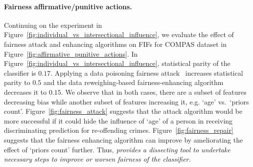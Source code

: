 \paragraph{Fairness affirmative/punitive actions.} Continuing on the experiment in Figure~\ref{fig:individual_vs_intersectional_influence}, we evaluate the effect of fairness attack and enhancing algorithms on FIFs for COMPAS dataset in Figure~\ref{fig:affirmative_punitive_actions}.  In Figure~\ref{fig:individual_vs_intersectional_influence}, statistical parity of the classifier is $ 0.17 $. Applying a data poisoning fairness attack~\cite{solans2020poisoning} increases statistical parity to $ 0.5 $ and the data reweighing-based fairness-enhancing algorithm~\cite{kamiran2012data} decreases it to $ 0.15$. We observe that in both cases, there are a subset of features decreasing bias while another subset of features increasing it, e.g. `age' vs.\ `priors count'. Figure~\ref{fig:fairness_attack} suggests that the attack algorithm would be more successful if it could hide the influence of `age' of a person in receiving discriminating prediction for re-offending crimes. Figure~\ref{fig:fairness_repair} suggests that the fairness enhancing algorithm can improve by ameliorating the effect of `priors count' further. Thus, \textit{{\fairXplainer} provides a dissecting tool to undertake necessary steps to improve or worsen fairness of the classifier.}



